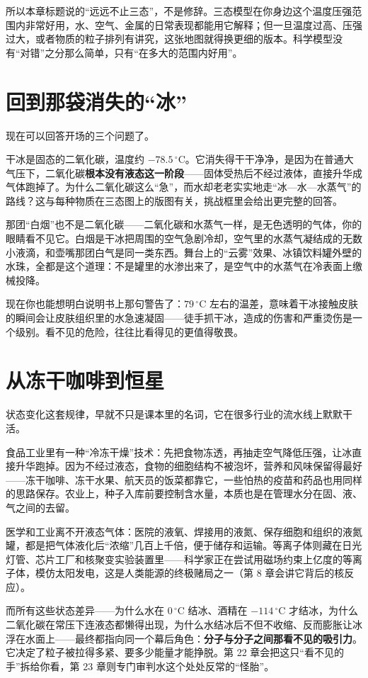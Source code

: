 所以本章标题说的“远远不止三态”，不是修辞。三态模型在你身边这个温度压强范围内非常好用，水、空气、金属的日常表现都能用它解释；但一旦温度过高、压强过大，或者物质的粒子排列有讲究，这张地图就得换更细的版本。科学模型没有“对错”之分那么简单，只有“在多大的范围内好用”。

\section{回到那袋消失的“冰”}

现在可以回答开场的三个问题了。

干冰是固态的二氧化碳，温度约 $-78.5\,^{\circ}\mathrm{C}$。它消失得干干净净，是因为在普通大气压下，二氧化碳\textbf{根本没有液态这一阶段}——固体受热后不经过液体，直接升华成气体跑掉了。为什么二氧化碳这么“急”，而水却老老实实地走“冰—水—水蒸气”的路线？这与每种物质在三态图上的版图有关，挑战框里会给出更完整的回答。

那团“白烟”也不是二氧化碳——二氧化碳和水蒸气一样，是无色透明的气体，你的眼睛看不见它。白烟是干冰把周围的空气急剧冷却，空气里的水蒸气凝结成的无数小液滴，和壶嘴那团白气是同一类东西。舞台上的“云雾”效果、冰镇饮料罐外壁的水珠，全都是这个道理：不是罐里的水渗出来了，是空气中的水蒸气在冷表面上缴械投降。

现在你也能想明白说明书上那句警告了：$79\,^{\circ}\mathrm{C}$ 左右的温差，意味着干冰接触皮肤的瞬间会让皮肤组织里的水急速凝固——徒手抓干冰，造成的伤害和严重烫伤是一个级别。看不见的危险，往往比看得见的更值得敬畏。

\section{从冻干咖啡到恒星}

状态变化这套规律，早就不只是课本里的名词，它在很多行业的流水线上默默干活。

食品工业里有一种“冷冻干燥”技术：先把食物冻透，再抽走空气降低压强，让冰直接升华跑掉。因为不经过液态，食物的细胞结构不被泡坏，营养和风味保留得最好——冻干咖啡、冻干水果、航天员的饭菜都靠它，一些怕热的疫苗和药品也用同样的思路保存。农业上，种子入库前要控制含水量，本质也是在管理水分在固、液、气之间的去留。

医学和工业离不开液态气体：医院的液氧、焊接用的液氮、保存细胞和组织的液氮罐，都是把气体液化后“浓缩”几百上千倍，便于储存和运输。等离子体则藏在日光灯管、芯片工厂和核聚变实验装置里——科学家正在尝试用磁场约束上亿度的等离子体，模仿太阳发电，这是人类能源的终极赌局之一（第 8 章会讲它背后的核反应）。

而所有这些状态差异——为什么水在 $0\,^{\circ}\mathrm{C}$ 结冰、酒精在 $-114\,^{\circ}\mathrm{C}$ 才结冰，为什么二氧化碳在常压下连液态都懒得出现，为什么水结冰后不但不收缩、反而膨胀让冰浮在水面上——最终都指向同一个幕后角色：\textbf{分子与分子之间那看不见的吸引力}。它决定了粒子被拉得多紧、要多少能量才能挣脱。第 22 章会把这只“看不见的手”拆给你看，第 23 章则专门审判水这个处处反常的“怪胎”。

